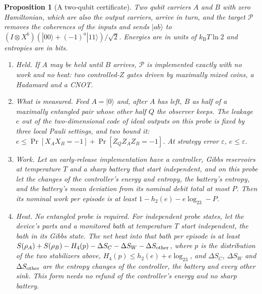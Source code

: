 \documentclass[11pt]{article}
\newtheorem{proposition}[theorem]{Proposition}
\theoremstyle{definition}
\theoremstyle{remark}
\newcommand{\kB}{k_{\mathrm B}}
\begin{document}
\begin{proposition}[A two-qubit certificate]\label{prop:certificate}
Two qubit carriers $A$ and $B$ with zero Hamiltonian, which are also the output carriers, arrive in turn, and the target $\mathcal P$ removes the coherences of the inputs and sends $|ab\rangle$ to $(I\otimes X^b)(|00\rangle+(-1)^a|11\rangle)/\sqrt2$. Energies are in units of $\kB T\ln2$ and entropies are in bits.
\begin{enumerate}[label=(\alph*), leftmargin=*]
\item \emph{Held.} If $A$ may be held until $B$ arrives, $\mathcal P$ is implemented exactly with no work and no heat: two controlled-$Z$ gates driven by maximally mixed coins, a Hadamard and a CNOT.
\item \emph{What is measured.} Feed $A=|0\rangle$ and, after $A$ has left, $B$ as half of a maximally entangled pair whose other half $Q$ the observer keeps. The leakage $e$ out of the two-dimensional code of ideal outputs on this probe is fixed by three local Pauli settings, and two bound it: $e\le\Pr[X_AX_B=-1]+\Pr[Z_QZ_AZ_B=-1]$. At strategy error $\varepsilon$, $e\le\varepsilon$.
\item \emph{Work.} Let an early-release implementation have a controller, Gibbs reservoirs at temperature $T$ and a sharp battery that start independent, and on this probe let the changes of the controller's energy and entropy, the battery's entropy, and the battery's mean deviation from its nominal debit total at most $P$. Then its nominal work per episode is at least $1-h_2(e)-e\log_23-P$.
\item \emph{Heat.} No entangled probe is required. For independent probe states, let the device's parts and a monitored bath at temperature $T$ start independent, the bath in its Gibbs state. The net heat into that bath per episode is at least $S(\rho_A)+S(\rho_B)-H_4(p)-\Delta S_C-\Delta S_W-\Delta S_{\rm other}$, where $p$ is the distribution of the two stabilizers above, $H_4(p)\le h_2(e)+e\log_23$, and $\Delta S_C$, $\Delta S_W$ and $\Delta S_{\rm other}$ are the entropy changes of the controller, the battery and every other sink. This form needs no refund of the controller's energy and no sharp battery.
\end{enumerate}
\end{proposition}
\end{document}

